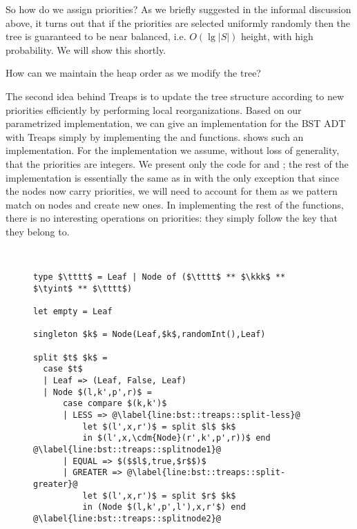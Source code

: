 \begin{chapter}
So how do we assign priorities?  As we briefly suggested in the
informal discussion above, it turns out that if the priorities are
selected uniformly randomly then the tree is guaranteed to be near
balanced, i.e. $O(\lg |S|)$ height, with high probability.  We will
show this shortly.

\begin{question}
How can we maintain the heap order as we modify the tree?
\end{question}

The second idea behind Treaps is to update the tree structure
according to new priorities efficiently by performing local
reorganizations.
%
Based on our parametrized implementation, we can give an
implementation for the BST ADT with Treaps simply by implementing the
 and  functions.   shows
such an implementation.  For the implementation we assume, without
loss of generality, that the priorities are integers.  We present only
the code for  and ; the rest of the
implementation is essentially the same as in 
with the only exception that since the nodes now carry priorities, we
will need to account for them as we pattern match on nodes and create
new ones.  In implementing the rest of the functions, there is no
interesting operations on priorities: they simply follow the key that
they belong to.



\begin{figure}
\begin{datastructure}~
\label{ds:bst::treaps}
\begin{lstlisting}
type $\tttt$ = Leaf | Node of ($\tttt$ ** $\kkk$ ** $\tyint$ ** $\tttt$)

let empty = Leaf

singleton $k$ = Node(Leaf,$k$,randomInt(),Leaf)

split $t$ $k$ = 
  case $t$ 
  | Leaf => (Leaf, False, Leaf)
  | Node $(l,k',p',r)$ =
      case compare $(k,k')$
      | LESS => @\label{line:bst::treaps::split-less}@
          let $(l',x,r')$ = split $l$ $k$
          in $(l',x,\cdm{Node}(r',k',p',r))$ end @\label{line:bst::treaps::splitnode1}@
      | EQUAL => $($$l$,true,$r$$)$
      | GREATER => @\label{line:bst::treaps::split-greater}@
          let $(l',x,r')$ = split $r$ $k$
          in (Node $(l,k',p',l'),x,r'$) end @\label{line:bst::treaps::splitnode2}@


\end{lstlisting}
\end{datastructure}
\end{figure}
\end{chapter}
